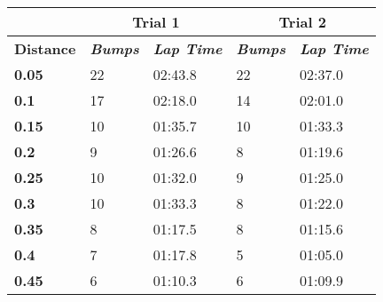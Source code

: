 \begin{table}[ht]
\begin{tabular}{l|l|l|l|l|}
\cline{2-5}
                                        & \multicolumn{2}{c|}{\textbf{Trial 1}}                & \multicolumn{2}{c|}{\textbf{Trial 2}}                \\ \hline
\multicolumn{1}{|l|}{\textbf{Distance}} & \textit{\textbf{Bumps}} & \textit{\textbf{Lap Time}} & \textit{\textbf{Bumps}} & \textit{\textbf{Lap Time}} \\ \hline
\multicolumn{1}{|l|}{\textbf{0.05}}     & 22                      & 02:43.8                    & 22                      & 02:37.0                    \\ \hline
\multicolumn{1}{|l|}{\textbf{0.1}}      & 17                      & 02:18.0                    & 14                      & 02:01.0                    \\ \hline
\multicolumn{1}{|l|}{\textbf{0.15}}     & 10                      & 01:35.7                    & 10                      & 01:33.3                    \\ \hline
\multicolumn{1}{|l|}{\textbf{0.2}}      & 9                       & 01:26.6                    & 8                       & 01:19.6                    \\ \hline
\multicolumn{1}{|l|}{\textbf{0.25}}     & 10                      & 01:32.0                    & 9                       & 01:25.0                    \\ \hline
\multicolumn{1}{|l|}{\textbf{0.3}}      & 10                      & 01:33.3                    & 8                       & 01:22.0                    \\ \hline
\multicolumn{1}{|l|}{\textbf{0.35}}     & 8                       & 01:17.5                    & 8                       & 01:15.6                    \\ \hline
\multicolumn{1}{|l|}{\textbf{0.4}}      & 7                       & 01:17.8                    & 5                       & 01:05.0                    \\ \hline
\multicolumn{1}{|l|}{\textbf{0.45}}     & 6                       & 01:10.3                    & 6                       & 01:09.9                    \\ \hline
\end{tabular}
\end{table}
